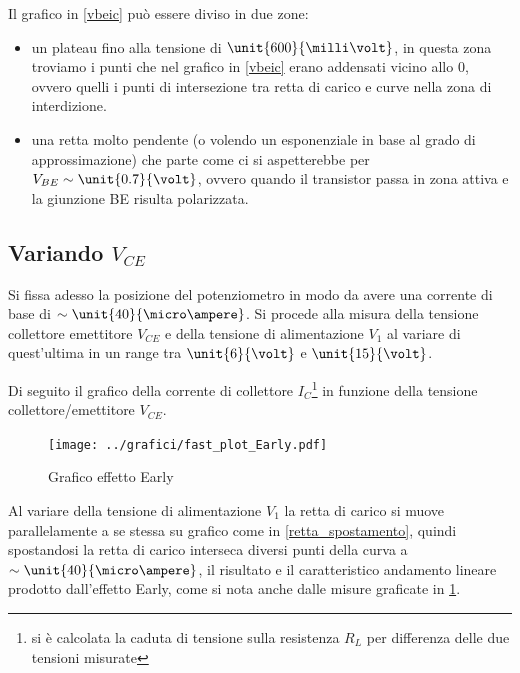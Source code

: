 \documentclass[10pt,a4paper]{article}
\begin{document}
Il grafico in \figurename{\ref{vbeic}} può essere diviso in due zone:
\begin{itemize}
	\item un plateau fino alla tensione di $\unit{600}{\milli\volt}$, in questa zona troviamo i punti che nel grafico in \figurename{\ref{vbeic}} erano addensati vicino allo $0$, ovvero quelli i punti di intersezione tra retta di carico e curve nella zona di interdizione.
	\item una retta molto pendente (o volendo un esponenziale in base al grado di approssimazione) che parte come ci si aspetterebbe per $V_{BE} \sim \unit{0.7}{\volt}$, ovvero quando il transistor passa in zona attiva e la giunzione BE risulta polarizzata.
\end{itemize}

\subsection{Variando $V_{CE}$}
Si fissa adesso la posizione del potenziometro in modo da avere una corrente di base di $\sim \unit{40}{\micro\ampere}$. Si procede alla misura della tensione collettore emettitore $V_{CE}$ e della tensione di alimentazione $V_1$ al variare di quest'ultima in un range tra $\unit{6}{\volt}$ e $\unit{15}{\volt}$.

Di seguito il grafico della corrente di collettore $I_C$\footnote{si è calcolata la caduta di tensione sulla resistenza $R_L$ per differenza delle due tensioni misurate} in funzione della tensione collettore/emettitore $V_{CE}$.

\begin{figure}[h!]
	\centering
	\begin{minipage}[h!]{0.3\textwidth}
		\centering
		\resizebox{\textwidth}{!}{
			}
	\end{minipage}
	\begin{minipage}[d]{0.69\textwidth}
		\centering
		\texttt{[image: ../grafici/fast\_plot\_Early.pdf]}
		\caption{Grafico effetto Early}
		\label{early}
	\end{minipage}
\end{figure}

Al variare della tensione di alimentazione $V_1$ la retta di carico si muove parallelamente a se stessa su grafico come in \figurename{\ref{retta_spostamento}}, quindi spostandosi la retta di carico interseca diversi punti della curva a  $\sim \unit{40}{\micro\ampere}$, il risultato e il caratteristico andamento lineare prodotto dall'effetto Early, come si nota anche dalle misure graficate in \figurename{\ref{early}}.
\end{document}
